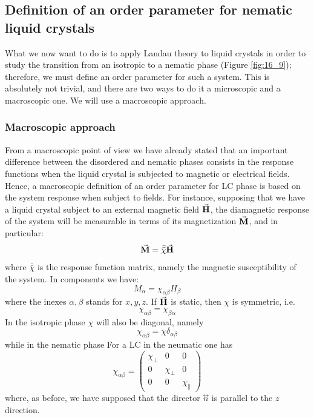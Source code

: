\documentclass[../main/main.tex]{subfiles}
\begin{document}
\subsection{Definition of an order parameter for nematic liquid crystals}
What we now want to do is to apply Landau theory to liquid crystals in order to study the transition from an isotropic to a nematic phase (Figure \ref{fig:16_9}); therefore, we must define an order parameter for such a system. This is absolutely not trivial, and there are two ways to do it a microscopic and a macroscopic one. We will use a macroscopic approach.

\subsubsection{Macroscopic approach}
From a macroscopic point of view we have already stated that an important difference between the disordered and nematic phases consists in the response functions when the liquid crystal is subjected to magnetic or electrical fields. Hence, a macroscopic definition of an order parameter for LC phase is based on the system response when subject to fields. For instance, supposing that we have a liquid crystal subject to an external magnetic field \( \va{H} \), the diamagnetic response of the system will be measurable in terms of its magnetization \( \va{M} \), and in particular:
\begin{equation}
  \va{M} = \bar{\bar{\chi } } \va{H}
\end{equation}
where  \(  \bar{\bar{\chi } } \) is the response function matrix, namely the magnetic susceptibility of the system. In components we have:
\begin{equation}
  M_ \alpha = \chi _{\alpha \beta } H _{\beta }
\end{equation}
where the inexes \( \alpha , \beta  \) stands for \( x,y,z \). If \( \va{H} \) is static, then \( \chi  \) is symmetric, i.e.
\begin{equation*}
  \chi _{\alpha \beta } = \chi _{\beta \alpha }
\end{equation*}
In the isotropic phase \( \chi  \) will also be diagonal, namely
\begin{equation*}
  \chi _{\alpha \beta } = \chi  \delta _{\alpha \beta }
\end{equation*}
while in the nematic phase
For a LC in the neumatic one has
\begin{equation}
  \chi _{\alpha \beta } =
  \begin{pmatrix}
  \chi _\bot   &  0 & 0 \\
    0 &  \chi _ \bot & 0 \\
    0 &  0 &  \chi _\parallel
  \end{pmatrix}
\end{equation}
where, as before, we have supposed that the director \( \overset{\leftrightarrow}{n} \) is parallel to the \( z \) direction.
\end{document}
